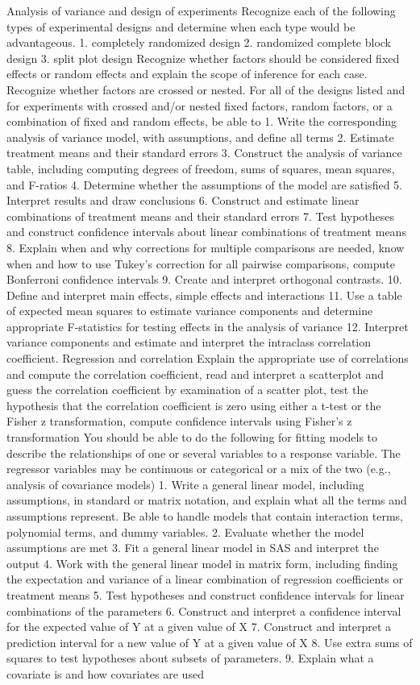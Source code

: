 \documentclass[
]{book}
\theoremstyle{definition}
\theoremstyle{definition}
\theoremstyle{definition}
\theoremstyle{remark}
\begin{document}
Analysis of variance and design of experiments
Recognize each of the following types of experimental designs and determine when each type would be advantageous.
1. completely randomized design
2. randomized complete block design
3. split plot design
Recognize whether factors should be considered fixed effects or random effects and explain the scope of inference for each case.
Recognize whether factors are crossed or nested.
For all of the designs listed and for experiments with crossed and/or nested fixed factors, random factors, or a combination of fixed and random effects, be able to
1. Write the corresponding analysis of variance model, with assumptions, and define all terms
2. Estimate treatment means and their standard errors
3. Construct the analysis of variance table, including computing degrees of freedom, sums of squares, mean squares, and F-ratios
4. Determine whether the assumptions of the model are satisfied
5. Interpret results and draw conclusions
6. Construct and estimate linear combinations of treatment means and their standard errors
7. Test hypotheses and construct confidence intervals about linear combinations of treatment means
8. Explain when and why corrections for multiple comparisons are needed, know when and how to use Tukey's correction for all pairwise comparisons, compute Bonferroni confidence intervals
9. Create and interpret orthogonal contrasts.
10. Define and interpret main effects, simple effects and interactions
11. Use a table of expected mean squares to estimate variance components and determine appropriate F-statistics for testing effects in the analysis of variance
12. Interpret variance components and estimate and interpret the intraclass correlation coefficient.
Regression and correlation
Explain the appropriate use of correlations and compute the correlation coefficient, read and interpret a scatterplot and guess the correlation coefficient by examination of a scatter plot, test the hypothesis that the correlation coefficient is zero using either a t-test or the Fisher z transformation, compute confidence intervals using Fisher's z transformation
You should be able to do the following for fitting models to describe the relationships of one or several variables to a response variable. The regressor variables may be continuous or categorical or a mix of the two (e.g., analysis of covariance models)
1. Write a general linear model, including assumptions, in standard or matrix notation, and explain what all the terms and assumptions represent. Be able to handle models that contain interaction terms, polynomial terms, and dummy variables.
2. Evaluate whether the model assumptions are met
3. Fit a general linear model in SAS and interpret the output
4. Work with the general linear model in matrix form, including finding the expectation and variance of a linear combination of regression coefficients or treatment means
5. Test hypotheses and construct confidence intervals for linear combinations of the parameters
6. Construct and interpret a confidence interval for the expected value of Y at a given value of X
7. Construct and interpret a prediction interval for a new value of Y at a given value of X
8. Use extra sums of squares to test hypotheses about subsets of parameters.
9. Explain what a covariate is and how covariates are used
\end{document}
